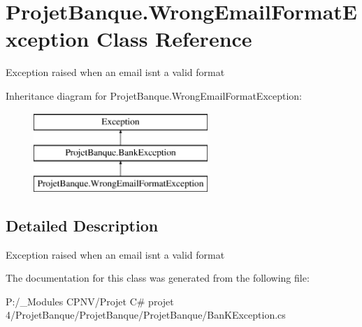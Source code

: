 \hypertarget{class_projet_banque_1_1_wrong_email_format_exception}{}\section{Projet\+Banque.\+Wrong\+Email\+Format\+Exception Class Reference}
\label{class_projet_banque_1_1_wrong_email_format_exception}


Exception raised when an email isn\textquotesingle{}t a valid format  


Inheritance diagram for Projet\+Banque.\+Wrong\+Email\+Format\+Exception\+:\begin{figure}[H]
\begin{center}
\leavevmode
\includegraphics[height=3.000000cm]{class_projet_banque_1_1_wrong_email_format_exception}
\end{center}
\end{figure}


\subsection{Detailed Description}
Exception raised when an email isn\textquotesingle{}t a valid format 



The documentation for this class was generated from the following file\+:\begin{DoxyCompactItemize}
\item 
P\+:/\+\_\+\+Modules C\+P\+N\+V/\+Projet C\# projet 4/\+Projet\+Banque/\+Projet\+Banque/\+Projet\+Banque/Ban\+K\+Exception.\+cs\end{DoxyCompactItemize}
